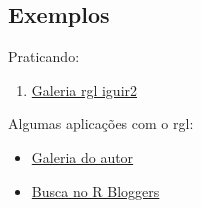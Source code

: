 
\subsection{Exemplos}

\begin{frame}

  Praticando:
  \begin{enumerate}
  \item \href{run:../rgl/rgl.html}{Galeria rgl iguir2}
  \end{enumerate}

  \vspace{0.5cm} Algumas aplicações com o rgl:
  \begin{itemize}
  \item
    \href{http://cran.r-project.org/web/packages/rgl/vignettes/}{Galeria
      do autor}
  \item \href{http://www.r-bloggers.com/?s=rgl}{Busca no R Bloggers}
  \end{itemize}

\end{frame}
